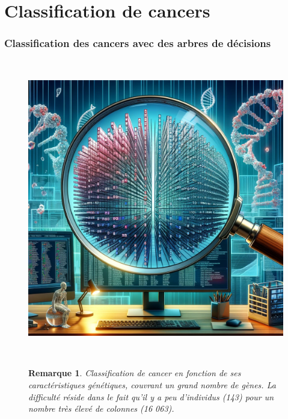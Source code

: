 \documentclass{beamer}
\newtheorem{rmq}{Remarque}
\theoremstyle{definition}
\begin{document}
\section{Classification de cancers}

\begin{frame}
	\frametitle{Classification des cancers avec des arbres de décisions}
	\hfill\\[-0.7cm]
	\begin{figure}
		\centering
		\includegraphics[width=0.4\linewidth]{cancers.png}
		
		\raggedright
		\hfill\\[-0.6cm]
		\begin{rmq}
			Classification de cancer en fonction de ses caractéristiques génétiques, couvrant un grand nombre de gènes. La difficulté réside dans le fait qu’il y a peu d’individus (143) pour un nombre très élevé de colonnes (16 063).
		\end{rmq}
		
		
	\end{figure}
\end{frame}
\end{document}
